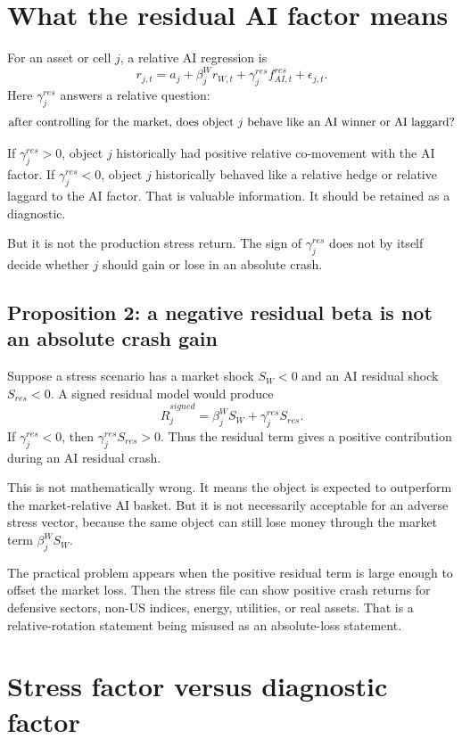 \documentclass[11pt]{article}
\begin{document}
\section{What the residual AI factor means}

For an asset or cell $j$, a relative AI regression is
\[
r_{j,t}=a_j+\beta_j^W r_{W,t}+\gamma_j^{res}f_{AI,t}^{res}+\epsilon_{j,t}.
\]
Here $\gamma_j^{res}$ answers a relative question:
\[
\hbox{after controlling for the market, does object }j\hbox{ behave like an AI winner or AI laggard?}
\]

If $\gamma_j^{res}>0$, object $j$ historically had positive relative co-movement with the AI factor. If $\gamma_j^{res}<0$, object $j$ historically behaved like a relative hedge or relative laggard to the AI factor. That is valuable information. It should be retained as a diagnostic.

But it is not the production stress return. The sign of $\gamma_j^{res}$ does not by itself decide whether $j$ should gain or lose in an absolute crash.

\subsection*{Proposition 2: a negative residual beta is not an absolute crash gain}

Suppose a stress scenario has a market shock $S_W<0$ and an AI residual shock $S_{res}<0$. A signed residual model would produce
\[
\widehat R_j^{signed}=\beta_j^W S_W+\gamma_j^{res}S_{res}.
\]
If $\gamma_j^{res}<0$, then $\gamma_j^{res}S_{res}>0$. Thus the residual term gives a positive contribution during an AI residual crash.

This is not mathematically wrong. It means the object is expected to outperform the market-relative AI basket. But it is not necessarily acceptable for an adverse stress vector, because the same object can still lose money through the market term $\beta_j^W S_W$.

The practical problem appears when the positive residual term is large enough to offset the market loss. Then the stress file can show positive crash returns for defensive sectors, non-US indices, energy, utilities, or real assets. That is a relative-rotation statement being misused as an absolute-loss statement.

\section{Stress factor versus diagnostic factor}
\end{document}
